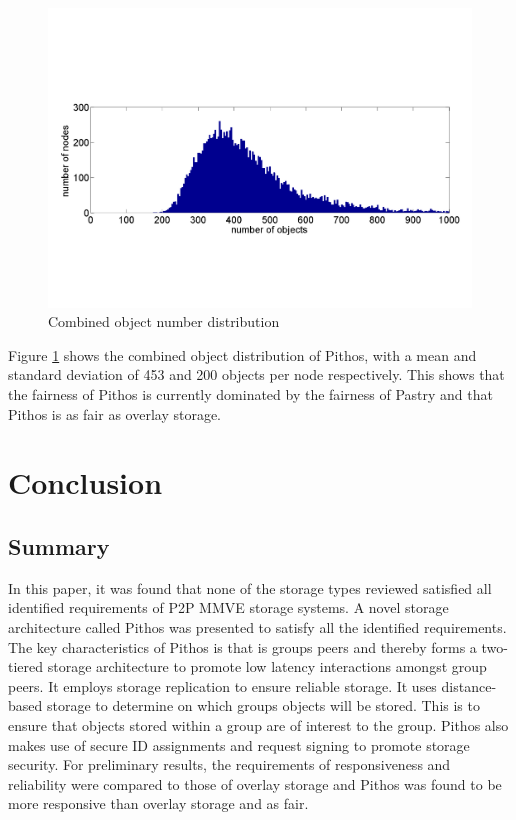 \documentclass[10pt,a4paper,conference]{IEEEtran}
\begin{document}
\begin{figure}[htbp]
 \centering
 \includegraphics[clip=true, viewport=1cm 5cm 29cm 14.5cm, width=\columnwidth]{Objects}
 \caption{Combined object number distribution}
 \label{fig_objects}
\end{figure}
%
Figure \ref{fig_objects} shows the combined object distribution of Pithos, with a mean and standard deviation of 453 and 200 objects per node
respectively. This shows that the fairness of Pithos is currently dominated by the fairness of Pastry and that Pithos is as fair as overlay storage.

\section{Conclusion}
\label{conclusion}

\subsection{Summary}

In this paper, it was found that none of the storage types reviewed satisfied all identified requirements of P2P MMVE storage systems. A novel
storage architecture called Pithos was presented to satisfy all the identified requirements. The key characteristics of Pithos is that is groups
peers and thereby forms a two-tiered storage architecture to promote low latency interactions amongst group peers. It employs storage replication to
ensure reliable storage. It uses distance-based storage to determine on which groups objects will be stored. This is to ensure that objects stored
within a group are of interest to the group. Pithos also makes use of secure ID assignments and request signing to promote storage security. For
preliminary results, the requirements of responsiveness and reliability were compared to those of overlay storage and Pithos was found to be more
responsive than overlay storage and as fair.
\end{document}
